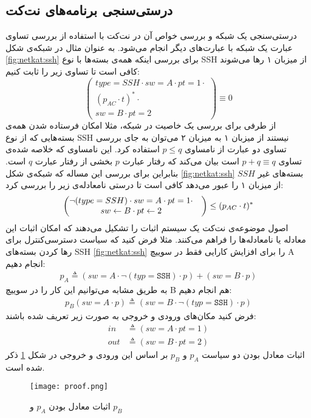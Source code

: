 \subsection{درستی‌سنجی برنامه‌های نت‌کت}
درستی‌سنجی یک شبکه و بررسی خواص آن در نت‌کت با استفاده از بررسی تساوی عبارت یک شبکه با عبارت‌های دیگر انجام می‌شود.
به عنوان مثال در شبکه‌ی شکل
\ref{fig:netkat:ssh}
برای بررسی اینکه همه‌ی بسته‌ها با نوع
SSH
از میزبان ۱ رها می‌شوند کافی است تا تساوی زیر را ثابت کنیم:
\begin{equation*}
    \begin{pmatrix}
        type = SSH \cdot sw = A \cdot pt = 1 \cdot \\
        (p_{AC}\cdot t) ^ * \cdot                  \\
        sw = B\cdot pt = 2
    \end{pmatrix}
    \equiv 0
\end{equation*}
از طرفی برای بررسی یک خاصیت در شبکه، مثلا امکان فرستاده شدن‌ همه‌ی بسته‌هایی که از نوع
SSH
نیستند از میزبان ۱ به میزبان ۲
می‌توان به جای بررسی تساوی دو عبارت از نامساوی
$p \leq q$
استفاده کرد.
این نامساوی که خلاصه شده‌ی تساوی
$p + q \equiv q$
است بیان می‌کند که رفتار عبارت
$p$
بخشی از رفتار عبارت
$q$
است.
بنابراین برای بررسی این مساله که شبکه‌ی شکل
\ref{fig:netkat:ssh}
بسته‌های غیر
$SSH$
از میزبان ۱ را عبور می‌دهد کافی است تا درستی نامعادله‌ی زیر را بررسی کرد:
\begin{equation*}
    \begin{pmatrix}
        \neg(type = SSH) \cdot sw = A \cdot pt = 1 \cdot & \\
        sw \leftarrow B \cdot pt \leftarrow 2                          &
    \end{pmatrix}
    \leq (p_{AC}\cdot t)^ *
\end{equation*}
اصول موضوعه‌ی نت‌کت یک سیستم اثبات
را تشکیل می‌دهند که امکان اثبات این معادله یا نامعادله‌ها را فراهم می‌کنند.
مثلا فرض کنید که سیاست دسترسی‌کنترل برای رها کردن بسته‌های
SSH
\ref{fig:netkat:ssh}
را برای افزایش کارایی فقط در سوییچ
A
انجام دهیم:
\begin{align*}
    p_A \triangleq (sw = A \cdot \neg(typ = \texttt{SSH})\cdot p)
    + (sw = B \cdot p)
\end{align*}
به طریق مشابه می‌توانیم این کار را در سوییچ
B
هم انجام دهیم:
\begin{align*}
    p_B (sw = A\cdot p) \triangleq (sw = B \cdot \neg(typ = \texttt{SSH})\cdot p)
\end{align*}
فرض کنید مکان‌های ورودی و خروجی به صورت زیر تعریف شده باشند:
\begin{align*}
    in  & \triangleq (sw = A \cdot pt = 1) \\
    out & \triangleq (sw = B \cdot pt = 2)
\end{align*}
اثبات معادل بودن دو سیاست
$p_A$
و
$p_B$
بر اساس این ورودی و خروجی در شکل
\ref{fig:netkat:proof}
ذکر شده است.

\begin{figure}
    \centering
    \texttt{[image: proof.png]}
    \caption{اثبات معادل بودن
        $p_A$
        و
        $p_B$
        \cite{netkat}
    }
    \label{fig:netkat:proof}
\end{figure}